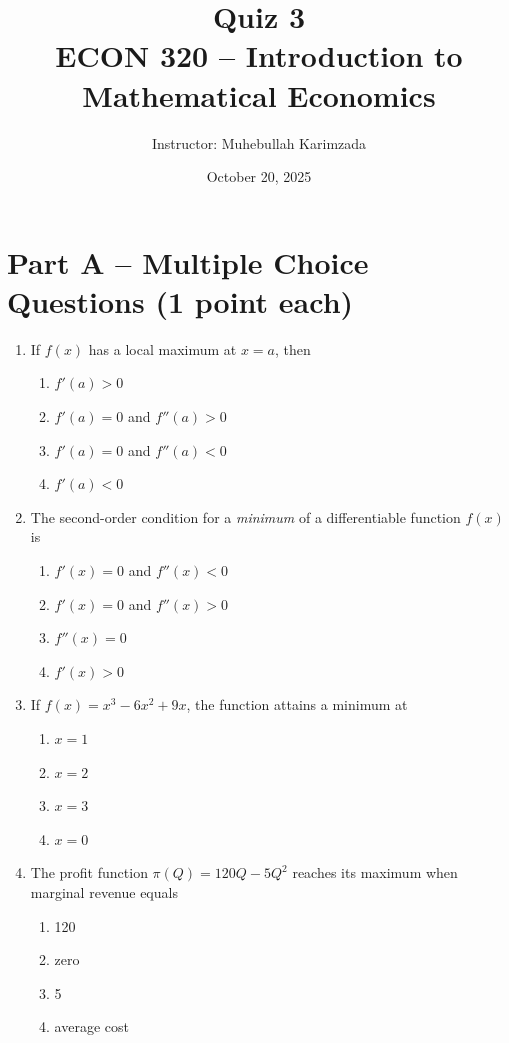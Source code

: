 \documentclass[12pt]{article}
\title{Quiz 3\\ \vspace{10pt}
\large ECON 320 -- Introduction to Mathematical Economics}
\author{Instructor: Muhebullah Karimzada}
\date{October 20, 2025}
\begin{document}
\maketitle



\section*{Part A – Multiple Choice Questions (1 point each)}

\begin{enumerate}
\item If \(f(x)\) has a local maximum at \(x=a\), then  
\begin{enumerate}
\item \(f'(a)>0\)  
\item \(f'(a)=0\) and \(f''(a)>0\)  
\item \(f'(a)=0\) and \(f''(a)<0\)  
\item \(f'(a)<0\)
\end{enumerate}

\item The second-order condition for a \textit{minimum} of a differentiable function \(f(x)\) is  
\begin{enumerate}
\item \(f'(x)=0\) and \(f''(x)<0\)  
\item \(f'(x)=0\) and \(f''(x)>0\)  
\item \(f''(x)=0\)  
\item \(f'(x)>0\)
\end{enumerate}

\item If \(f(x)=x^3-6x^2+9x\), the function attains a minimum at  
\begin{enumerate}
\item \(x=1\)  
\item \(x=2\)  
\item \(x=3\)  
\item \(x=0\)
\end{enumerate}

\newpage

\item The profit function \(\pi(Q)=120Q-5Q^2\) reaches its maximum when marginal revenue equals  
\begin{enumerate}
\item 120  
\item zero  
\item 5  
\item average cost
\end{enumerate}


\end{enumerate}
\end{document}
